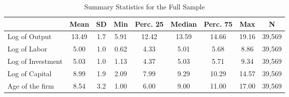 \begin{table}[htbp]\centering
\def\sym#1{\ifmmode^{#1}\else\(^{#1}\)\fi}
\caption{Summary Statistics for the Full Sample \label{tab:fullstats}}
\begin{tabular}{l*{1}{cccccccc}}
\toprule
                    &        Mean&          SD&         Min&    Perc. 25&      Median&    Perc. 75&         Max&           N\\
\midrule
Log of Output       &       13.49&         1.7&        5.91&       12.42&       13.59&       14.66&       19.16&      39,569\\
Log of Labor        &        5.00&         1.0&        0.62&        4.33&        5.01&        5.68&        8.86&      39,569\\
Log of Investment   &        5.03&         1.0&        1.13&        4.37&        5.03&        5.71&        9.34&      39,569\\
Log of Capital      &        8.99&         1.9&        2.09&        7.99&        9.29&       10.29&       14.57&      39,569\\
Age of the firm     &        8.54&         3.2&        1.00&        6.00&        9.00&       11.00&       17.00&      39,569\\
\bottomrule
\end{tabular}
\end{table}
